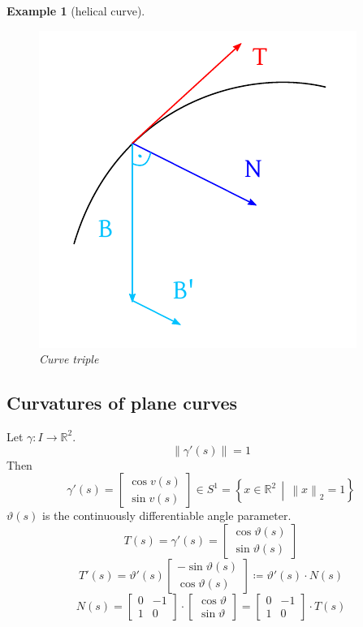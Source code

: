 \documentclass{article}
\newtheorem{example}{Example}  \numberwithin{example}{section}
\newcommand{\setdef}[2]{\left\{\left.#1\,\middle|\,#2\right.\right\}}
\newcommand{\norm}[1]{\left\|#1\right\|}
\begin{document}
\begin{example}[helical curve]
  \begin{figure}[t]
    \begin{center}
      \includegraphics{img/54_curve_triple.pdf}
      \caption{Curve triple}
      \label{img:triple}
    \end{center}
  \end{figure}
\end{example}

\subsection{Curvatures of plane curves}
Let $\gamma: I \to \mathbb R^2$.
\[ \norm{\gamma'(s)} = 1 \]
Then
\[
  \gamma'(s) = \begin{bmatrix}
    \cos{v(s)} \\
    \sin{v(s)}
  \end{bmatrix} \in S^1
  = \setdef{x \in \mathbb R^2}{\norm{x}_2 = 1}
\]
$\vartheta(s)$ is the continuously differentiable angle parameter.
\[ T(s) = \gamma'(s) = \begin{bmatrix} \cos{\vartheta(s)} \\ \sin{\vartheta(s)} \end{bmatrix} \]
\[ T'(s) = \vartheta'(s) \begin{bmatrix} -\sin{\vartheta(s)} \\ \cos\vartheta(s) \end{bmatrix} \coloneqq \vartheta'(s) \cdot N(s) \]
\[ N(s) = \begin{bmatrix} 0 & -1 \\ 1 & 0 \end{bmatrix} \cdot \begin{bmatrix} \cos{\vartheta} \\ \sin{\vartheta} \end{bmatrix} = \begin{bmatrix} 0 & -1 \\ 1 & 0 \end{bmatrix} \cdot T(s) \]
\end{document}
